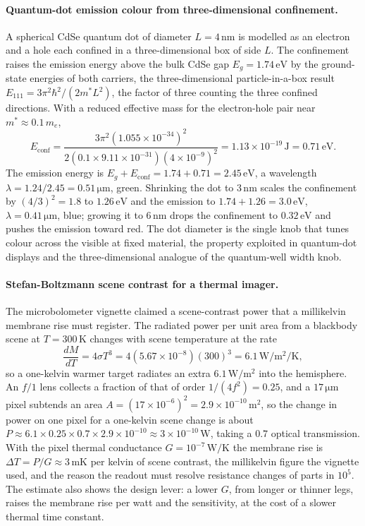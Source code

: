 \paragraph{Quantum-dot emission colour from three-dimensional confinement.}
A spherical CdSe quantum dot of diameter $L = 4\,\si{\nano\meter}$ is
modelled as an electron and a hole each confined in a three-dimensional
box of side $L$. The confinement raises the emission energy above the bulk
CdSe gap $E_g = 1.74\,\si{\electronvolt}$ by the ground-state energies of
both carriers, the three-dimensional particle-in-a-box result $E_{111} =
3\pi^{2}\hbar^{2}/(2m^{*}L^{2})$, the factor of three counting the three
confined directions. With a reduced effective mass for the electron-hole
pair near $m^{*} \approx 0.1\,m_e$,
\[
E_{\text{conf}} = \frac{3\pi^{2}(1.055\times 10^{-34})^{2}}
                       {2(0.1\times 9.11\times 10^{-31})(4\times 10^{-9})^{2}}
= 1.13\times 10^{-19}\,\si{\joule} = 0.71\,\si{\electronvolt}.
\]
The emission energy is $E_g + E_{\text{conf}} = 1.74 + 0.71 = 2.45\,\si{
\electronvolt}$, a wavelength $\lambda = 1.24/2.45 = 0.51\,\si{\micro
\meter}$, green. Shrinking the dot to $3\,\si{\nano\meter}$ scales the
confinement by $(4/3)^{2} = 1.8$ to $1.26\,\si{\electronvolt}$ and the
emission to $1.74 + 1.26 = 3.0\,\si{\electronvolt}$, $\lambda = 0.41\,\si{
\micro\meter}$, blue; growing it to $6\,\si{\nano\meter}$ drops the
confinement to $0.32\,\si{\electronvolt}$ and pushes the emission toward
red. The dot diameter is the single knob that tunes colour across the
visible at fixed material, the property exploited in quantum-dot displays
and the three-dimensional analogue of the quantum-well width knob.

\paragraph{Stefan-Boltzmann scene contrast for a thermal imager.}
The microbolometer vignette claimed a scene-contrast power that a
millikelvin membrane rise must register. The radiated power per unit area
from a blackbody scene at $T = 300\,\si{\kelvin}$ changes with scene
temperature at the rate
\[
\frac{dM}{dT} = 4\sigma T^{3}
= 4(5.67\times 10^{-8})(300)^{3}
= 6.1\,\si{\watt\per\meter\squared\per\kelvin},
\]
so a one-kelvin warmer target radiates an extra $6.1\,\si{\watt\per
\meter\squared}$ into the hemisphere. An $f/1$ lens collects a fraction of
that of order $1/(4 f^{2}) = 0.25$, and a $17\,\si{\micro\meter}$ pixel
subtends an area $A = (17\times 10^{-6})^{2} = 2.9\times 10^{-10}\,\si{
\meter\squared}$, so the change in power on one pixel for a one-kelvin
scene change is about $P \approx 6.1\times 0.25\times 0.7\times 2.9\times
10^{-10} \approx 3\times 10^{-10}\,\si{\watt}$, taking a $0.7$ optical
transmission. With the pixel thermal conductance $G = 10^{-7}\,\si{\watt
\per\kelvin}$ the membrane rise is $\Delta T = P/G \approx 3\,\si{\milli
\kelvin}$ per kelvin of scene contrast, the millikelvin figure the
vignette used, and the reason the readout must resolve resistance changes
of parts in $10^{5}$. The estimate also shows the design lever: a lower
$G$, from longer or thinner legs, raises the membrane rise per watt and
the sensitivity, at the cost of a slower thermal time constant.


